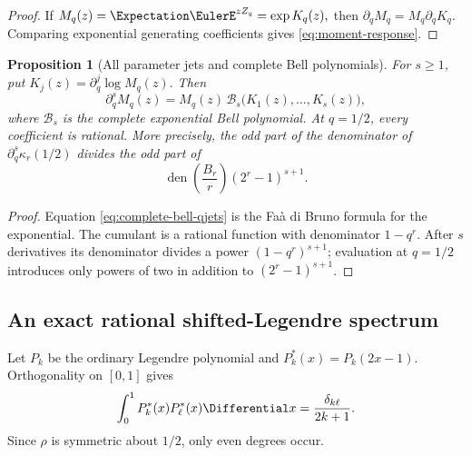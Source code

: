 \documentclass[11pt,oneside]{article}
\newtheorem{proposition}[theorem]{Proposition}
\theoremstyle{definition}
\theoremstyle{remark}
\begin{document}
\begin{proof}
If
\(
 M_q(z)=\Expectation\EulerE^{zZ_q}=\exp K_q(z),
\)
then \(\partial_qM_q=M_q\partial_qK_q\).  Comparing exponential generating coefficients
gives \eqref{eq:moment-response}.
\end{proof}

\begin{proposition}[All parameter jets and complete Bell polynomials]
\label{prop:all-qjets}
For \(s\ge1\), put
\(
 K_j(z)=\partial_q^j\log M_q(z).
\)
Then
\begin{equation}
 \partial_q^sM_q(z)
 =M_q(z)\,\mathcal B_s\bigl(K_1(z),\ldots,K_s(z)\bigr),
 \label{eq:complete-bell-qjets}
\end{equation}
where \(\mathcal B_s\) is the complete exponential Bell polynomial.  At \(q=1/2\), every
coefficient is rational.  More precisely, the odd part of the denominator of
\(\partial_q^s\kappa_r(1/2)\) divides the odd part of
\begin{equation}
 \operatorname{den}\!\left(\frac{B_r}{r}\right)(2^r-1)^{s+1}.
 \label{eq:cyclotomic-denominator-bound}
\end{equation}
\end{proposition}

\begin{proof}
Equation \eqref{eq:complete-bell-qjets} is the Fa\`a di Bruno formula for the exponential.
The cumulant is a rational function with denominator \(1-q^r\).  After \(s\) derivatives its
denominator divides a power \((1-q^r)^{s+1}\); evaluation at \(q=1/2\) introduces only powers
of two in addition to \((2^r-1)^{s+1}\).
\end{proof}

\subsection{An exact rational shifted-Legendre spectrum}

Let \(P_k\) be the ordinary Legendre polynomial and
\(P_k^*(x)=P_k(2x-1)\).  Orthogonality on \([0,1]\) gives
\[
 \int_0^1P_k^*(x)P_\ell^*(x)\Differential x=\frac{\delta_{k\ell}}{2k+1}.
\]
Since \(\rho\) is symmetric about \(1/2\), only even degrees occur.
\end{document}

